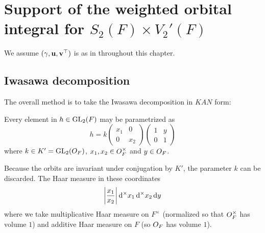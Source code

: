 \chapter{Support of the weighted orbital integral for $S_2(F) \times V_2'(F)$}
\label{ch:orbitalFJ1}

We assume ${(\gamma, \mathbf u, \mathbf v^\top)}$ is as in  throughout this chapter.

\section{Iwasawa decomposition}
The overall method is to take the Iwasawa decomposition in $KAN$ form:
\begin{lemma}
  Every element in $h \in \operatorname{GL}_2(F)$ may be parametrized as
  \[ h = k \begin{pmatrix} x_1 & 0 \\ 0 & x_2 \end{pmatrix}
    \begin{pmatrix} 1 & y \\ 0 & 1 \end{pmatrix} \]
  where $k \in K' = \operatorname{GL}_2(O_F)$, $x_1, x_2 \in O_F^\times$ and $y \in O_F$.
\end{lemma}
Because the orbits are invariant under conjugation by $K'$,
the parameter $k$ can be discarded.
The Haar measure in these coordinates
\[ \left\lvert \frac{x_1}{x_2} \right\rvert \odif[\times] x_1 \odif[\times] x_2 \odif y \]
where we take multiplicative Haar measure on $F^\times$
(normalized so that $O_F^\times$ has volume $1$)
and additive Haar measure on $F$ (so $O_F$ has volume $1$).

